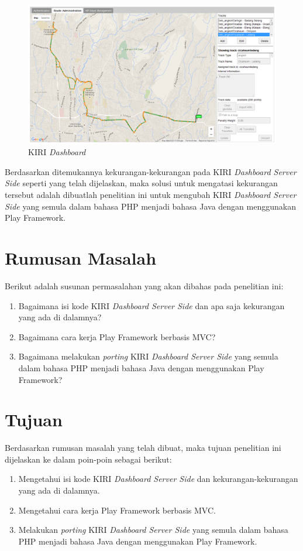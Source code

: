 \begin{figure}[htbp]
	\centering
		\includegraphics[scale=0.35]{Gambar/1_kiridashboard.png}
	\caption{KIRI \textit{Dashboard}\cite{devkiritravel}}
	\label{fig:1_kiridashboard}
\end{figure}

Berdasarkan ditemukannya kekurangan-kekurangan pada KIRI \textit{Dashboard Server Side} seperti yang telah dijelaskan, maka solusi untuk mengatasi kekurangan tersebut adalah dibuatlah penelitian ini untuk mengubah KIRI \textit{Dashboard Server Side} yang semula dalam bahasa PHP menjadi bahasa Java dengan menggunakan Play Framework.

\section{Rumusan Masalah}
\label{sec:rumusan_masalah}
Berikut adalah susunan permasalahan yang akan dibahas pada penelitian ini:
	\begin{enumerate}
		\item Bagaimana isi kode KIRI \textit{Dashboard Server Side} dan apa saja kekurangan yang ada di dalamnya?
		\item Bagaimana cara kerja Play Framework berbasis MVC?
		\item Bagaimana melakukan \textit{porting} KIRI \textit{Dashboard Server Side} yang semula dalam bahasa PHP menjadi bahasa
Java dengan menggunakan Play Framework?
	\end{enumerate}
	
\section{Tujuan}
\label{sec:tujuan}
Berdasarkan rumusan masalah yang telah dibuat, maka tujuan penelitian ini dijelaskan ke dalam poin-poin sebagai berikut:
	\begin{enumerate}
		\item Mengetahui isi kode KIRI \textit{Dashboard Server Side} dan kekurangan-kekurangan yang ada di dalamnya.
		\item Mengetahui cara kerja Play Framework berbasis MVC.
		\item Melakukan \textit{porting} KIRI \textit{Dashboard Server Side} yang semula dalam bahasa PHP menjadi bahasa
Java dengan menggunakan Play Framework.
	\end{enumerate}
	
